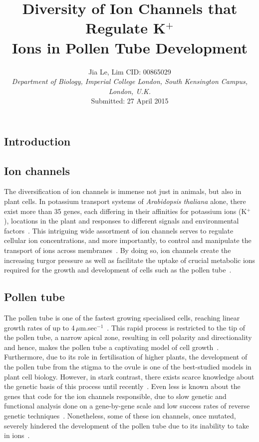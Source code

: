 \documentclass[11pt]{article}
\title{\textbf{\huge{Diversity of Ion Channels that Regulate K$^{+}$ \\ \vspace{0.2cm}
Ions in Pollen Tube Development}}}
\date{}
\author{%
\large{ Jia Le, Lim {  } CID: 00865029 } \\
\textnormal
{\textit{Department of Biology, Imperial College London, South Kensington Campus, London, U.K.}} \\
Submitted: 27 April 2015
}
\makeatletter
\renewcommand{\maketitle}{\bgroup\setlength{\parindent}{0pt}
\begin{flushleft}
  \textbf{\@title} %
  
  \@author
\end{flushleft}\egroup
}
\makeatother
\begin{document}
\maketitle
\bigskip
\begin{multicols}{2} %
\tableofcontents    

\section{Introduction} 
\subsection{Ion channels}
The diversification of ion channels is immense not just in animals, but also in plant cells. In potassium transport systems of \textit{Arabidopsis thaliana} alone, there exist more than 35 genes, each differing in their affinities for potassium ions (K$^{+}$), locations in the plant and responses to different signals and environmental factors~\citep{Maser2001}. 
This intriguing wide assortment of ion channels serves to regulate cellular ion concentrations, and more importantly, to control and manipulate the transport of ions across membranes~\citep{Maathuis1997}. By doing so, ion channels create the increasing turgor pressure as well as facilitate the uptake of crucial metabolic ions required for the growth and development of cells such as the pollen tube~\citep{Benkert1997}. 

\subsection{Pollen tube}
The pollen tube is one of the fastest growing specialised cells, reaching linear growth rates of up to 4\,$\mu$m.sec$^{-1}$~\citep{Michard2009}. This rapid process is restricted to the tip of the pollen tube, a narrow apical zone, resulting in cell polarity and directionality and hence, makes the pollen tube a captivating model of cell growth~\citep{Feijo1995}. Furthermore, due to its role in fertilisation of higher plants, the development of the pollen tube from the stigma to the ovule is one of the best-studied models in plant cell biology. However, in stark contrast, there exists scarce knowledge  about the genetic basis of this process until recently~\citep{Becker2003}. Even less is known about the genes that code for the ion channels responsible, due to slow genetic and functional analysis done on a gene-by-gene scale and low success rates of reverse genetic techniques~\citep{Lebaudy2007a}. Nonetheless, some of these ion channels, once mutated, severely hindered the development of the pollen tube due to its inability to take in ions~\citep{Mouline2002}. 


\end{multicols}
\end{document}

